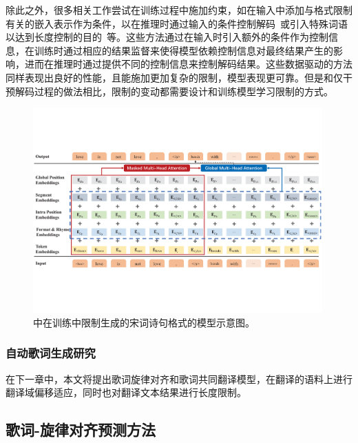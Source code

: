 除此之外，很多相关工作尝试在训练过程中施加约束，如在输入中添加与格式限制有关的嵌入表示作为条件，以在推理时通过输入的条件控制解码~\citep{li-etal-2020-rigid}或引入特殊词语以达到长度控制的目的~\citep{lakew-etal-2019-controlling,saboo-baumann-2019-integration}等。这些方法通过在输入时引入额外的条件作为控制信息，在训练时通过相应的结果监督来使得模型依赖控制信息对最终结果产生的影响，进而在推理时通过提供不同的控制信息来控制解码结果。这些数据驱动的方法同样表现出良好的性能，且能施加更加复杂的限制，模型表现更可靠。但是和仅干预解码过程的做法相比，限制的变动都需要设计和训练模型学习限制的方式。
\begin{figure}[ht]
  \includegraphics[width=0.99\textwidth]{figure/related/train_constrain.pdf}
  \caption{\citet{li-etal-2020-rigid}中在训练中限制生成的宋词诗句格式的模型示意图。}
\end{figure}
\subsubsection{自动歌词生成研究}

在下一章中，本文将提出歌词旋律对齐和歌词共同翻译模型，在翻译的语料上进行翻译域偏移适应，同时也对翻译文本结果进行长度限制。
\subsection{歌词-旋律对齐预测方法}
